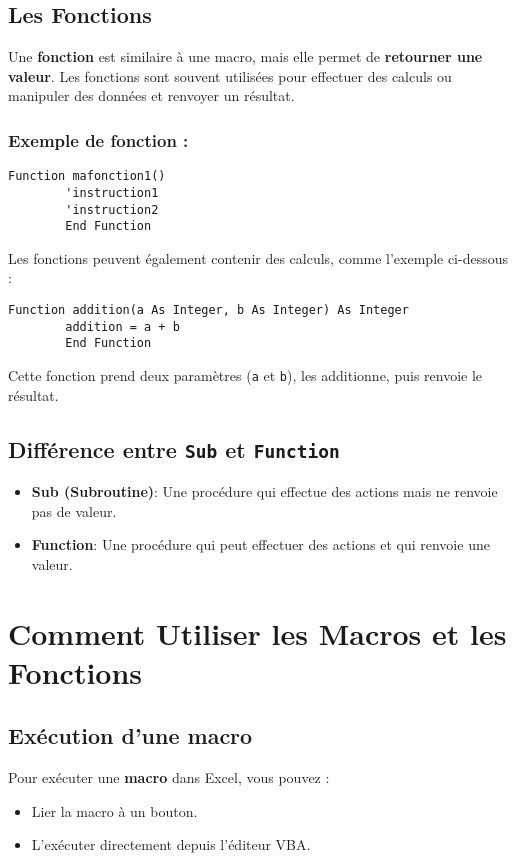 \documentclass[a4paper,12pt]{report}
\begin{document}
	\subsection{Les Fonctions}
	Une \textbf{fonction} est similaire à une macro, mais elle permet de \textbf{retourner une valeur}. Les fonctions sont souvent utilisées pour effectuer des calculs ou manipuler des données et renvoyer un résultat. 
	
	\subsubsection*{Exemple de fonction :}
	\begin{lstlisting}[caption=Définition d'une fonction]
		Function mafonction1()
		'instruction1
		'instruction2
		End Function
	\end{lstlisting}
	\newpage
	Les fonctions peuvent également contenir des calculs, comme l'exemple ci-dessous :
	
	\begin{lstlisting}[caption=Fonction avec retour de valeur]
		Function addition(a As Integer, b As Integer) As Integer
		addition = a + b
		End Function
	\end{lstlisting}
	
	Cette fonction prend deux paramètres (\texttt{a} et \texttt{b}), les additionne, puis renvoie le résultat.
	
	\subsection{Différence entre \texttt{Sub} et \texttt{Function}}
	\begin{itemize}
		\item \textbf{Sub (Subroutine)}: Une procédure qui effectue des actions mais ne renvoie pas de valeur.
		\item \textbf{Function}: Une procédure qui peut effectuer des actions et qui renvoie une valeur.
	\end{itemize}
	
	\section{Comment Utiliser les Macros et les Fonctions}
	\subsection{Exécution d'une macro}
	Pour exécuter une \textbf{macro} dans Excel, vous pouvez :
	\begin{itemize}
		\item Lier la macro à un bouton.
		\item L'exécuter directement depuis l'éditeur VBA.
	\end{itemize}
	
\end{document}
